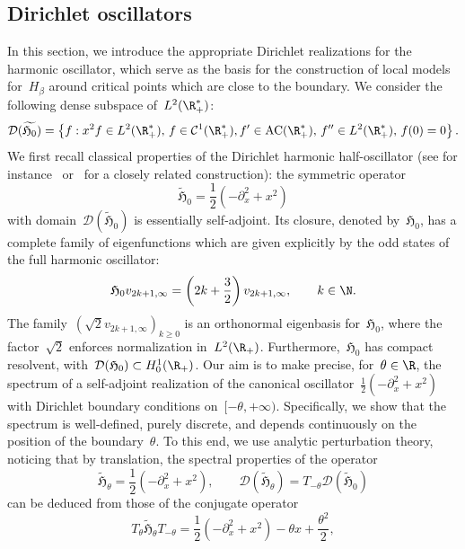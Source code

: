     \subsection{Dirichlet oscillators}\label{02:subsec:dirichlet_oscillators}
    In this section, we introduce the appropriate Dirichlet realizations for the harmonic oscillator, which serve as the basis for the construction of local models for~$H_\beta$ around critical points which are close to the boundary.
    We consider the following dense subspace of~$L^2(\R_+^*)$:
    \[\mathcal D(\widetilde{\mathfrak H_0}) = \left\{f:x^2 f\in L^2(\R_+^*),\,f\in\mathcal C^1(\R_+^*),f'\in\mathrm{AC}(\R_+^*),\,f''\in L^2(\R_+^*),\,f(0)=0\right\}.\]
    We first recall classical properties of the Dirichlet harmonic half-oscillator (see for instance~\cite[Chapter X.1]{RS75} or~\cite[Section 5.1.2]{BS12} for a closely related construction): the symmetric operator
   ~$$ \widetilde{\mathfrak H}_0 = \frac12(-\partial_x^2+x^2)$$
    with domain~$\mathcal D(\widetilde{\mathfrak H}_0)$ is essentially self-adjoint. Its closure, denoted by~$\mathfrak{H}_0$, has a complete family of eigenfunctions which are given explicitly by the odd states of the full harmonic oscillator:
    \begin{equation}
        \label{02:harmonic_half_oscillator}
        \mathfrak{H}_0 v_{2k+1,\infty} = \left(2k + \frac32\right) v_{2k+1,\infty},\qquad k\in \N.
    \end{equation}
    The family~$(\sqrt 2 v_{2k+1,\infty})_{k\geq 0}$ is an orthonormal eigenbasis for~$\mathfrak{H}_0$, where the factor~$\sqrt 2$ enforces normalization in~$L^2(\R_+)$. Furthermore,~$\mathfrak{H}_0$ has compact resolvent, with~$\mathcal D({\mathfrak{H}}_0) \subset H_0^1(\R_+)$.
    Our aim is to make precise, for~$\theta\in\R$, the spectrum of a self-adjoint realization of the canonical oscillator~$\frac12(-\partial_x^2+x^2)$ with Dirichlet boundary conditions on~$[-\theta,+\infty)$. Specifically, we show that the spectrum is well-defined, purely discrete, and depends continuously on the position of the boundary~$\theta$.
    To this end, we use analytic perturbation theory, noticing that by translation, the spectral properties of the operator
   ~$$\widetilde{\mathfrak H}_\theta = \frac12(-\partial_x^2+x^2),\qquad \mathcal D(\widetilde{\mathfrak H}_\theta) = T_{-\theta}\mathcal D(\widetilde{\mathfrak H}_0)$$
    can be deduced from those of the conjugate operator
   ~\begin{equation}
    \label{02:eq:perturbation_conjugate}
    T_{\theta} \widetilde{\mathfrak H}_\theta  T_{-\theta}=\frac12(-\partial_x^2+x^2) - \theta x +\frac{\theta^2}2,
   \end{equation}  
